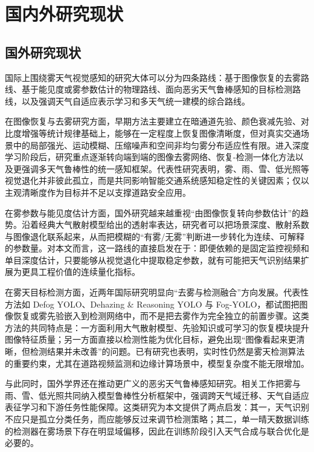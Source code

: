 \section{国内外研究现状}

\subsection{国外研究现状}

国际上围绕雾天气视觉感知的研究大体可以分为四条路线：基于图像恢复的去雾路线、基于能见度或雾参数估计的物理路线、面向恶劣天气鲁棒感知的目标检测路线，以及强调天气自适应表示学习和多天气统一建模的综合路线\cite{defogYolo2024,dehazingReasoningYolo2024,robustWeatherDetection2024,warlearn2025}。

在图像恢复与去雾研究方面，早期方法主要建立在暗通道先验、颜色衰减先验、对比度增强等统计规律基础上，能够在一定程度上恢复图像清晰度，但对真实交通场景中的局部强光、运动模糊、压缩噪声和空间非均匀雾分布适应性有限。进入深度学习阶段后，研究重点逐渐转向端到端的图像去雾网络、恢复-检测一体化方法以及更强调多天气鲁棒性的统一感知框架。代表性研究表明，雾、雨、雪、低光照等视觉退化并非彼此孤立，而是共同影响智能交通系统感知稳定性的关键因素；仅以主观清晰度作为目标并不足以支撑道路安全应用\cite{defogYolo2024,dehazingReasoningYolo2024,robustWeatherDetection2024,warlearn2025}。

在雾参数与能见度估计方面，国外研究越来越重视“由图像恢复转向参数估计”的趋势。沿着经典大气散射模型给出的透射率表达，研究者可以把场景深度、散射系数与图像退化联系起来，从而把模糊的“有雾/无雾”判断进一步转化为连续、可解释的参数量\cite{koschmieder}。对本文而言，这一路线的直接启发在于：即便依赖的是固定监控视频和单目深度估计，只要能够从视觉退化中提取稳定参数，就有可能把天气识别结果扩展为更具工程价值的连续量化指标。

在雾天目标检测方面，近两年国际研究明显向“去雾与检测融合”方向发展。代表性方法如 Defog YOLO、Dehazing \& Reasoning YOLO 与 Fog-YOLO，都试图把图像恢复或雾先验嵌入到检测网络中，而不是把去雾作为完全独立的前置步骤\cite{defogYolo2024,dehazingReasoningYolo2024,fogyolo2026}。这类方法的共同特点是：一方面利用大气散射模型、先验知识或可学习的恢复模块提升图像特征质量；另一方面直接以检测性能为优化目标，避免出现“图像看起来更清晰，但检测结果并未改善”的问题。已有研究也表明，实时性仍然是雾天检测算法的重要约束，尤其在道路视频监测和边缘计算场景中，模型复杂度不能无限增加\cite{fogyolo2026}。

与此同时，国外学界还在推动更广义的恶劣天气鲁棒感知研究。相关工作把雾与雨、雪、低光照共同纳入模型鲁棒性分析框架中，强调跨天气域迁移、天气自适应表征学习和下游任务性能保障\cite{robustWeatherDetection2024,warlearn2025,improvedDeepsortFog2024}。这类研究为本文提供了两点启发：其一，天气识别不应只是孤立分类任务，而应能够反过来调节检测策略；其二，单一晴天数据训练的检测器在雾场景下存在明显域偏移，因此在训练阶段引入天气合成与联合优化是必要的。

